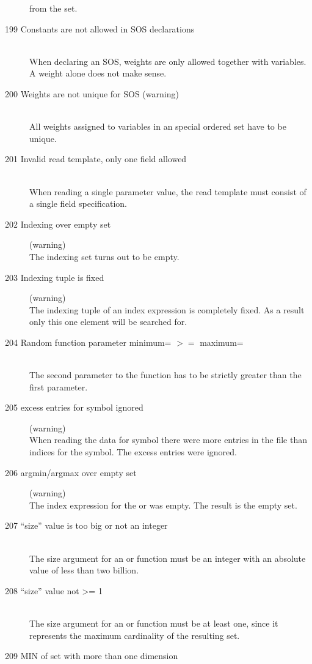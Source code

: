 \begin{description}
  from the set.
\item[199 Constants are not allowed in SOS declarations]\ \\
  When declaring an SOS, weights are only allowed together with
  variables. A weight alone does not make sense.
\item[200 Weights are not unique for SOS \code{xxx} (warning)]\ \\
  All weights assigned to variables in an special ordered set have to
  be unique. 
\item[201 Invalid read template, only one field allowed]\ \\
  When reading a single parameter value, the read template must
  consist of a single field specification.
\item[202 Indexing over empty set] (warning)\ \\
  The indexing set turns out to be empty.
\item[203 Indexing tuple is fixed] (warning)\ \\
  The indexing tuple of an index expression is completely fixed. As a
  result only this one element will be searched for.
\item[204 Random function parameter minimum= \code{xxx} $>=$ maximum=
  \code{yyy}]\ \\
  The second parameter to the function  has to be
  strictly greater than the first parameter.
\item[205 \code{xxx} excess entries for symbol \code{yyy} ignored ]
  (warning)\ \\
  When reading the data for symbol  there were 
   more entries in the file than indices for the symbol.
  The excess entries were ignored.  
\item[206 argmin/argmax over empty set] (warning)\ \\
   The index expression for the  or  was
   empty. The result is the empty set.
\item[207 ``size'' value \code{xxx} is too big or not an integer]\ \\
   The size argument for an  or  function
   must be an integer with an absolute value of less than two billion.
\item[208 ``size'' value \code{xxx} not >= 1]\ \\
   The size argument for an  or  function
   must be at least one, since it represents the maximum cardinality
   of the resulting set.
\item[209 MIN of set with more than one dimension]\ \\

\end{description}

